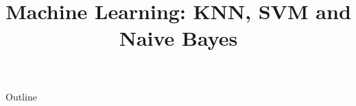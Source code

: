 \documentclass[xcolor=dvipsnames,compress,t,pdf,9pt]{beamer}
\title[\insertframenumber /\inserttotalframenumber]{Machine Learning: KNN, SVM and Naive Bayes}
\begin{document}
	\begin{frame}
	\titlepage
	\end{frame}

	\begin{frame}{Outline}
	    \tableofcontents
	\end{frame}

	
	
	
\end{document}
